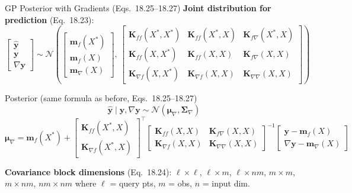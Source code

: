 \documentclass[aspectratio=169,10pt]{beamer}
\newcommand{\bmu}{\boldsymbol{\mu}}
\newcommand{\bSigma}{\boldsymbol{\Sigma}}
\newcommand{\Norm}{\mathcal{N}}
\begin{document}
\begin{frame}{GP Posterior with Gradients (Eqs.\ 18.25--18.27)}
  \textbf{Joint distribution for prediction} (Eq.\ 18.23):
  \[
    \begin{bmatrix}\hat{\mathbf{y}}\\\mathbf{y}\\\nabla\mathbf{y}\end{bmatrix}
    \sim \Norm\!\left(
      \begin{bmatrix}\mathbf{m}_f(X^*)\\\mathbf{m}_f(X)\\\mathbf{m}_\nabla(X)\end{bmatrix},\,
      \begin{bmatrix}
        \mathbf{K}_{ff}(X^*,X^*) & \mathbf{K}_{ff}(X^*,X) & \mathbf{K}_{f\nabla}(X^*,X)\\
        \mathbf{K}_{ff}(X,X^*)   & \mathbf{K}_{ff}(X,X)   & \mathbf{K}_{f\nabla}(X,X)\\
        \mathbf{K}_{\nabla f}(X,X^*)& \mathbf{K}_{\nabla f}(X,X) & \mathbf{K}_{\nabla\nabla}(X,X)
      \end{bmatrix}
    \right)
  \]
  \vspace{0.2em}
  \begin{block}{Posterior (same formula as before, Eqs.\ 18.25--18.27)}
    \[
      \hat{\mathbf{y}}\mid\mathbf{y},\nabla\mathbf{y}
      \sim \Norm(\bmu_\nabla, \bSigma_\nabla)
    \]
    \[
      \bmu_\nabla = \mathbf{m}_f(X^*) +
        \begin{bmatrix}\mathbf{K}_{ff}(X^*,X)\\\mathbf{K}_{\nabla f}(X^*,X)\end{bmatrix}^\top
        \begin{bmatrix}\mathbf{K}_{ff}(X,X) & \mathbf{K}_{f\nabla}(X,X)\\
                       \mathbf{K}_{\nabla f}(X,X) & \mathbf{K}_{\nabla\nabla}(X,X)\end{bmatrix}^{-1}
        \begin{bmatrix}\mathbf{y}-\mathbf{m}_f(X)\\\nabla\mathbf{y}-\mathbf{m}_\nabla(X)\end{bmatrix}
    \]
  \end{block}
  \vspace{0.2em}
  \textbf{Covariance block dimensions} (Eq.\ 18.24):
  $\ell\times\ell$, $\ell\times m$, $\ell\times nm$, $m\times m$, $m\times nm$,
  $nm\times nm$ where $\ell$ = query pts, $m$ = obs, $n$ = input dim.
\end{frame}
\end{document}
